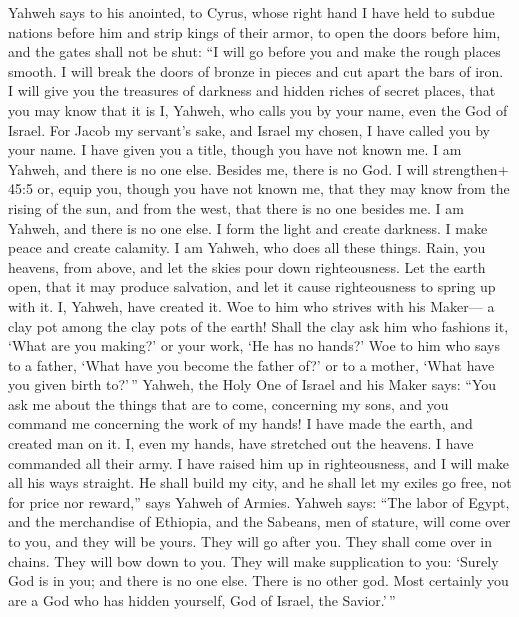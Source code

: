  Yahweh says to his anointed, to Cyrus, whose right hand I
have held to subdue nations before him and strip kings of their armor,
to open the doors before him, and the gates shall not be shut:
 ``I will go before you and make the rough places smooth. I
will break the doors of bronze in pieces and cut apart the bars of iron.
 I will give you the treasures of darkness and hidden riches
of secret places, that you may know that it is I, Yahweh, who calls you
by your name, even the God of Israel.  For Jacob my
servant's sake, and Israel my chosen, I have called you by your name. I
have given you a title, though you have not known me.  I am
Yahweh, and there is no one else. Besides me, there is no God. I will
strengthen+ 45:5 or, equip you, though you have not known me,
 that they may know from the rising of the sun, and from the
west, that there is no one besides me. I am Yahweh, and there is no one
else.  I form the light and create darkness. I make peace
and create calamity. I am Yahweh, who does all these things.
 Rain, you heavens, from above, and let the skies pour down
righteousness. Let the earth open, that it may produce salvation, and
let it cause righteousness to spring up with it. I, Yahweh, have created
it.  Woe to him who strives with his Maker--- a clay pot
among the clay pots of the earth! Shall the clay ask him who fashions
it, `What are you making?' or your work, `He has no hands?'
 Woe to him who says to a father, `What have you become the
father of?' or to a mother, `What have you given birth to?'\,''
 Yahweh, the Holy One of Israel and his Maker says: ``You
ask me about the things that are to come, concerning my sons, and you
command me concerning the work of my hands!  I have made
the earth, and created man on it. I, even my hands, have stretched out
the heavens. I have commanded all their army.  I have
raised him up in righteousness, and I will make all his ways straight.
He shall build my city, and he shall let my exiles go free, not for
price nor reward,'' says Yahweh of Armies.  Yahweh says:
``The labor of Egypt, and the merchandise of Ethiopia, and the Sabeans,
men of stature, will come over to you, and they will be yours. They will
go after you. They shall come over in chains. They will bow down to you.
They will make supplication to you: `Surely God is in you; and there is
no one else. There is no other god.  Most certainly you are
a God who has hidden yourself, God of Israel, the Savior.'\,''

